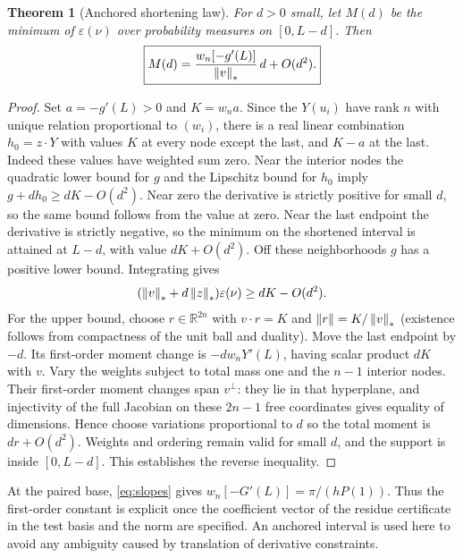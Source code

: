 \documentclass[11pt]{article}
\newtheorem{theorem}{Theorem}[section]
\theoremstyle{remark}\newtheorem{remark}[theorem]{Remark}
\newcommand{\R}{\mathbb R}\newcommand{\C}{\mathbb C}\newcommand{\supp}{\operatorname{supp}}
\begin{document}
\begin{theorem}[Anchored shortening law]\label{thm:short}
For $d>0$ small, let $M(d)$ be the minimum of $\varepsilon(\nu)$ over probability measures on $[0,L-d]$. Then
\[
 \boxed{M(d)=\frac{w_n[-g'(L)]}{\left\|v\right\|_*}\,d+O(d^2).}
\]
\end{theorem}
\begin{proof}
Set $a=-g'(L)>0$ and $K=w_na$. Since the $Y(u_i)$ have rank $n$ with unique relation proportional to $(w_i)$, there is a real linear combination $h_0=z\cdot Y$ with values $K$ at every node except the last, and $K-a$ at the last. Indeed these values have weighted sum zero. Near the interior nodes the quadratic lower bound for $g$ and the Lipschitz bound for $h_0$ imply $g+dh_0\ge dK-O(d^2)$. Near zero the derivative is strictly positive for small $d$, so the same bound follows from the value at zero. Near the last endpoint the derivative is strictly negative, so the minimum on the shortened interval is attained at $L-d$, with value $dK+O(d^2)$. Off these neighborhoods $g$ has a positive lower bound. Integrating gives
\[
 (\left\|v\right\|_*+d\left\|z\right\|_*)\varepsilon(\nu)\ge dK-O(d^2).
\]
For the upper bound, choose $r\in\R^{2n}$ with $v\cdot r=K$ and $\left\|r\right\|=K/\left\|v\right\|_*$ (existence follows from compactness of the unit ball and duality). Move the last endpoint by $-d$. Its first-order moment change is $-dw_nY'(L)$, having scalar product $dK$ with $v$. Vary the weights subject to total mass one and the $n-1$ interior nodes. Their first-order moment changes span $v^\perp$: they lie in that hyperplane, and injectivity of the full Jacobian on these $2n-1$ free coordinates gives equality of dimensions. Hence choose variations proportional to $d$ so the total moment is $dr+O(d^2)$. Weights and ordering remain valid for small $d$, and the support is inside $[0,L-d]$. This establishes the reverse inequality.
\end{proof}
At the paired base, \eqref{eq:slopes} gives $w_n[-G'(L)]=\pi/(hP(1))$. Thus the first-order constant is explicit once the coefficient vector of the residue certificate in the test basis and the norm are specified. An anchored interval is used here to avoid any ambiguity caused by translation of derivative constraints.
\end{document}
